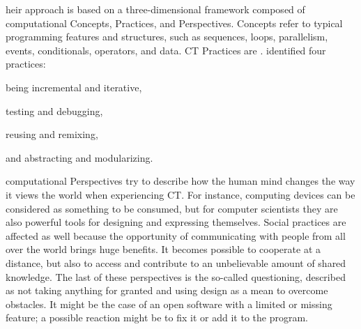 heir approach is based on a three-dimensional framework composed of computational Concepts, Practices, and Perspectives. Concepts refer to typical programming features and structures, such as sequences, loops, parallelism, events, conditionals, operators, and data. \ac{CT} Practices are .  identified four practices:
\begin{enumerate*}[label=(\arabic*)]
  \item being incremental and iterative,
  \item testing and debugging,
  \item reusing and remixing,
  \item and abstracting and modularizing.
\end{enumerate*}
 computational Perspectives try to describe how the human mind changes the way it views the world when experiencing \ac{CT}. For in\-stance, com\-put\-ing devices can be considered as something to be consumed, but for computer scientists they are also powerful tools for designing and expressing themselves. Social practices are affected as well because the opportunity of communicating with people from all over the world brings huge benefits. It becomes possible to cooperate at a distance, but also to access and contribute to an unbelievable amount of shared knowledge. The last of these perspectives is the so-called questioning, described as not taking anything for granted and using design as a mean to overcome obstacles. It might be the case of an open software with a limited or missing feature; a possible reaction might be to fix it or add it to the program.

